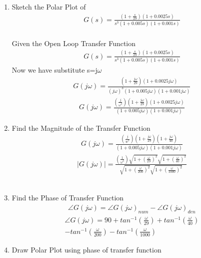  
\begin{enumerate}[label=\thesubsection.\arabic*.,ref=\thesubsection.\theenumi]
\item
Sketch the Polar Plot of
\begin{align}
G(s) = \frac{(1+\frac{s}{29})(1+0.0025s)}{s^{3}(1+0.005s)(1+0.001s)}
\end{align}
\\
\solution  
Given the Open Loop Transfer Function
\begin{align}
G(s) = \frac{(1+\frac{s}{29})(1+0.0025s)}{s^{3}(1+0.005s)(1+0.001s)}
\end{align}
Now we have substitute s=j$\omega$
\begin{align}
G(j\omega) = \frac{(1+\frac{j\omega}{29})(1+0.0025j\omega)}{(j\omega)^{3}(1+0.005j\omega)(1+0.001j\omega)}
\end{align}
\begin{align}
G(j\omega) = \frac{(\frac{j}{\omega^{3}})(1+\frac{j\omega}{29})(1+0.0025j\omega)}{(1+0.005j\omega)(1+0.001j\omega)}
\end{align}
\item
Find the Magnitude of the Transfer Function
\\
\solution
\begin{align}
G(j\omega) = \frac{(\frac{j}{w^{3}})(1+\frac{j\omega}{29})(1+\frac{j\omega}{40})}{(1+0.005j\omega)(1+0.001j\omega)}
\end{align}
\begin{multline}
      |G(j\omega)| = \frac{(\frac{1}{\omega^{3}})\sqrt{1+(\frac{\omega}{29})^2}\sqrt{1+(\frac{\omega}{40})^2}}{\sqrt{1+(\frac{\omega}{200})^2}\sqrt{1+(\frac{\omega}{1000})^2}}
\end{multline}\\
\item
Find the Phase of Transfer Function\\
\solution
\begin{align}
    \angle G(j\omega) = \angle G(j\omega)_{num} - \angle G(j\omega)_{den}
\end{align}
\begin{multline}
    \angle G(j\omega) = 90 + tan^{-1}(\frac{\omega}{29})+tan^{-1}(\frac{\omega}{40})\\ - tan^{-1}(\frac{\omega}{200})-tan^{-1}(\frac{\omega}{1000})
\end{multline}
\item
Draw Polar Plot using phase of transfer function\\
\solution\\

\end{enumerate}
